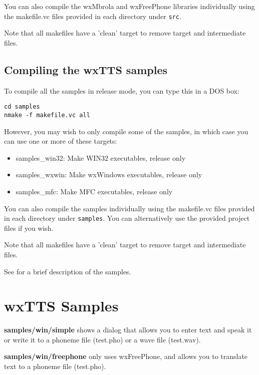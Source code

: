 You can also compile the wxMbrola and wxFreePhone libraries individually using the makefile.vc
files provided in each directory under {\tt src}.

Note that all makefiles have a 'clean' target to remove target and intermediate files.

\section{Compiling the wxTTS samples}

To compile all the samples in release mode, you can
type this in a DOS box:

{\small\begin{verbatim}
cd samples
nmake -f makefile.vc all
\end{verbatim}
}

However, you may wish to only compile some of the samples, in which case you can use
one or more of these targets:

\begin{itemize}\itemsep=0pt
\item samples\_win32: Make WIN32 executables, release only
\item samples\_wxwin: Make wxWindows executables, release only
\item samples\_mfc: Make MFC executables, release only
\end{itemize}

You can also compile the samples individually using the makefile.vc
files provided in each directory under {\tt samples}. You can alternatively use the
provided project files if you wish.

Note that all makefiles have a 'clean' target to remove target and intermediate files.

See  for a brief description of the samples.

\chapter{wxTTS Samples}\label{samples}
%
%
\setfooter{\thepage}{}{}{}{}{\thepage}%


{\bf samples/win/simple} shows a dialog that allows you to enter text
and speak it or write it to a phoneme file (test.pho) or a wave file (test.wav).

{\bf samples/win/freephone} only uses wxFreePhone, and allows you to translate text to
a phoneme file (test.pho).


